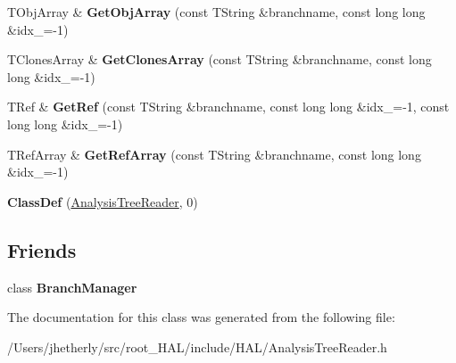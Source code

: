 \begin{DoxyCompactItemize}
\item 
\hypertarget{class_h_a_l_1_1_analysis_tree_reader_ad44870dd8478b8d404ede307726f2db6}{T\+Obj\+Array \& {\bfseries Get\+Obj\+Array} (const T\+String \&branchname, const long long \&idx\+\_=-\/1)}\label{class_h_a_l_1_1_analysis_tree_reader_ad44870dd8478b8d404ede307726f2db6}

\item 
\hypertarget{class_h_a_l_1_1_analysis_tree_reader_ae9115ce6bba555009b6b21eca20339c9}{T\+Clones\+Array \& {\bfseries Get\+Clones\+Array} (const T\+String \&branchname, const long long \&idx\+\_=-\/1)}\label{class_h_a_l_1_1_analysis_tree_reader_ae9115ce6bba555009b6b21eca20339c9}

\item 
\hypertarget{class_h_a_l_1_1_analysis_tree_reader_af010b9fafb8bd7f06efcaa46d1360253}{T\+Ref \& {\bfseries Get\+Ref} (const T\+String \&branchname, const long long \&idx\+\_=-\/1, const long long \&idx\+\_=-\/1)}\label{class_h_a_l_1_1_analysis_tree_reader_af010b9fafb8bd7f06efcaa46d1360253}

\item 
\hypertarget{class_h_a_l_1_1_analysis_tree_reader_a66bc43933f69938b94dd8caf5277395c}{T\+Ref\+Array \& {\bfseries Get\+Ref\+Array} (const T\+String \&branchname, const long long \&idx\+\_=-\/1)}\label{class_h_a_l_1_1_analysis_tree_reader_a66bc43933f69938b94dd8caf5277395c}

\item 
\hypertarget{class_h_a_l_1_1_analysis_tree_reader_ad8be72de7b7f4ae5ced82c636ac91dd1}{{\bfseries Class\+Def} (\hyperlink{class_h_a_l_1_1_analysis_tree_reader}{Analysis\+Tree\+Reader}, 0)}\label{class_h_a_l_1_1_analysis_tree_reader_ad8be72de7b7f4ae5ced82c636ac91dd1}

\end{DoxyCompactItemize}
\subsection*{Friends}
\begin{DoxyCompactItemize}
\item 
\hypertarget{class_h_a_l_1_1_analysis_tree_reader_a3b527c540b6431b5700a6d002214747c}{class {\bfseries Branch\+Manager}}\label{class_h_a_l_1_1_analysis_tree_reader_a3b527c540b6431b5700a6d002214747c}

\end{DoxyCompactItemize}


The documentation for this class was generated from the following file\+:\begin{DoxyCompactItemize}
\item 
/\+Users/jhetherly/src/root\+\_\+\+H\+A\+L/include/\+H\+A\+L/Analysis\+Tree\+Reader.\+h\end{DoxyCompactItemize}
